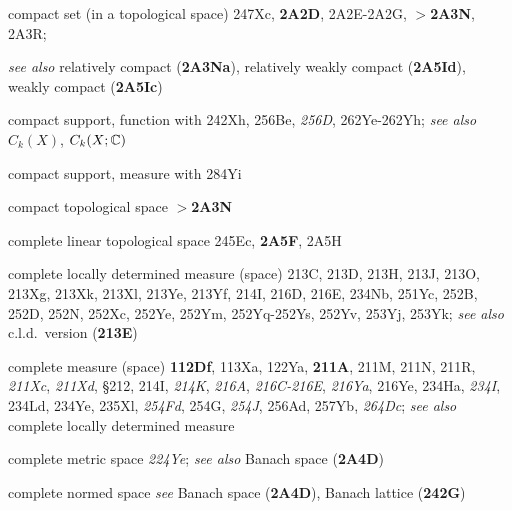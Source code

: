 compact set (in a topological space) 247Xc, {\bf 2A2D},
2A2E-2A2G, 
$\pmb{>}${\bf 2A3N}, 2A3R;  
  
  {\it see also} relatively compact ({\bf 2A3Na}),
relatively weakly compact ({\bf 2A5Id}), weakly compact ({\bf 2A5Ic})




compact support, function with 242Xh, 256Be, {\it 256D},
262Ye-262Yh;  
  {\it see also} $C_k(X)$, $C_k(X;\Bbb C)$


compact support, measure with 284Yi





compact topological space {\bf $\pmb{>}$2A3N}






























complete linear topological space 245Ec, {\bf 2A5F}, 2A5H


complete locally determined measure (space) 213C, 213D, 213H, 213J,
213O, 213Xg, 213Xk, 213Xl, 213Ye, 213Yf, 214I,
216D, 216E, 234Nb, 251Yc, 252B, 252D, 252N, 252Xc, 252Ye, 252Ym,
252Yq-252Ys, 
252Yv, 253Yj, 253Yk;  
  {\it see also} c.l.d.\ version ({\bf 213E})





complete measure (space) {\bf 112Df}, 113Xa, 122Ya,
  {\bf 211A}, 211M, 211N, 211R, {\it 211Xc}, {\it 211Xd}, \S212,
  214I, {\it 214K},
{\it 216A}, {\it 216C-216E}, 
{\it 216Ya}, 216Ye, 234Ha, {\it 234I}, 234Ld, 234Ye,
235Xl, {\it 254Fd}, 254G, {\it 254J}, 256Ad, 257Yb,
{\it 264Dc}; 
  {\it see also} complete locally determined measure
  


complete metric space {\it 224Ye};  
  {\it see also} Banach space ({\bf 2A4D})


complete normed space {\it see} Banach space ({\bf 2A4D}),
Banach lattice ({\bf 242G})


